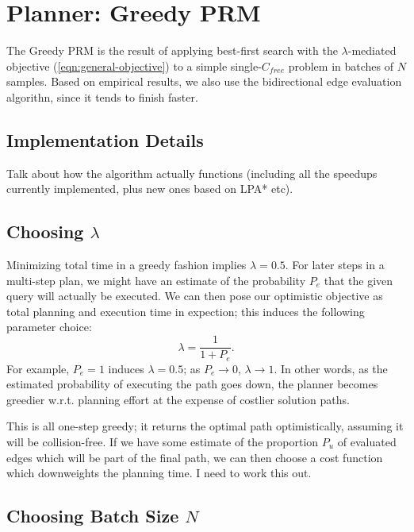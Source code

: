 \documentclass{report}
\begin{document}
\section{Planner: Greedy PRM}
\label{sec:greedy-prm}

The Greedy PRM is the result of applying
best-first search with the $\lambda$-mediated objective
(\ref{eqn:general-objective})
to a simple single-$C_{free}$ problem
in batches of $N$ samples.
Based on empirical results, we also use the bidirectional edge evaluation
algorithn,
since it tends to finish faster.

\subsection{Implementation Details}

Talk about how the algorithm actually functions
(including all the speedups currently implemented,
plus new ones based on LPA* etc).

\subsection{Choosing $\lambda$}

Minimizing total time in a greedy fashion implies $\lambda = 0.5$.
For later steps in a multi-step plan,
we might have an estimate of the probability $P_e$ that the given query will
actually be executed.
We can then pose our optimistic objective as total planning and execution
time in expection;
this induces the following parameter choice:
\begin{equation}
   \lambda = \frac{1}{1 + P_e} .
\end{equation}
For example, $P_e=1$ induces $\lambda = 0.5$;
as $P_e \rightarrow 0$, $\lambda \rightarrow 1$.
In other words,
as the estimated probability of executing the path goes down,
the planner becomes greedier w.r.t. planning effort at the expense of
costlier solution paths.

This is all one-step greedy;
it returns the optimal path optimistically,
assuming it will be collision-free.
If we have some estimate of the proportion $P_u$ of evaluated edges
which will be part of the final path,
we can then choose a cost function which downweights the planning time.
I need to work this out. 

\subsection{Choosing Batch Size $N$}
\end{document}
